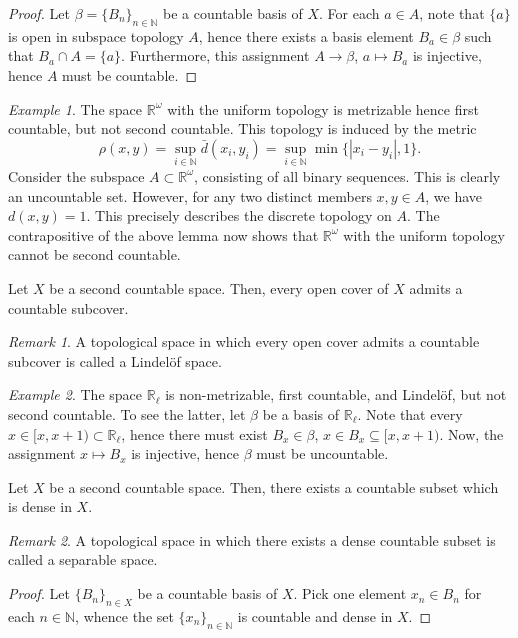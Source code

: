 \documentclass[11pt]{article}
\newcommand{\R}{\mathbb{R}}
\newcommand{\N}{\mathbb{N}}
\theoremstyle{definition}
\theoremstyle{remark}
\newtheorem*{remark}{Remark}
\newtheorem*{example}{Example}
\numberwithin{equation}{section}
\begin{document}
    \begin{proof}
        Let $\beta = \{B_n\}_{n \in \N}$ be a countable basis of $X$. For each $a \in
        A$, note that $\{a\}$ is open in subspace topology $A$, hence there exists a
        basis element $B_a \in \beta$ such that $B_a \cap A = \{a\}$. Furthermore,
        this assignment $A \to \beta$, $a \mapsto B_a$ is injective, hence $A$ must
        be countable.
    \end{proof}

    \begin{example}
        The space $\R^\omega$ with the uniform topology is metrizable hence first
        countable, but not second countable. This topology is induced by the metric
        \[
            \rho(x, y) = \sup_{i \in \N} \bar{d}(x_i, y_i) = \sup_{i \in \N}
            \min\{|x_i - y_i|, 1\}.
        \] Consider the subspace $A \subset \R^\omega$, consisting of all binary
        sequences. This is clearly an uncountable set. However, for any two distinct
        members $x, y \in A$, we have $d(x, y) = 1$. This precisely describes the
        discrete topology on $A$. The contrapositive of the above lemma now shows
        that $\R^\omega$ with the uniform topology cannot be second countable.
    \end{example}

    \begin{lemma}
        Let $X$ be a second countable space. Then, every open cover of $X$ admits a
        countable subcover.
        \begin{remark}
            A topological space in which every open cover admits a countable subcover
            is called a Lindel\"of space.
        \end{remark}
    \end{lemma}

    \begin{example}
        The space $\R_\ell$ is non-metrizable, first countable, and Lindel\"of, but
        not second countable. To see the latter, let $\beta$ be a basis of $\R_\ell$.
        Note that every $x \in [x, x + 1) \subset \R_\ell$, hence there must exist
        $B_x \in \beta$, $x \in B_x \subseteq [x, x + 1)$. Now, the assignment $x
        \mapsto B_x$ is injective, hence $\beta$ must be uncountable.
    \end{example}
    
    \begin{lemma}
        Let $X$ be a second countable space. Then, there exists a countable subset
        which is dense in $X$.
        \begin{remark}
            A topological space in which there exists a dense countable subset is
            called a separable space.
        \end{remark}
    \end{lemma}
    \begin{proof}
        Let $\{B_n\}_{n \in X}$ be a countable basis of $X$. Pick one element $x_n
        \in B_n$ for each $n \in \N$, whence the set $\{x_n\}_{n \in \N}$ is
        countable and dense in $X$.
    \end{proof}
\end{document}
